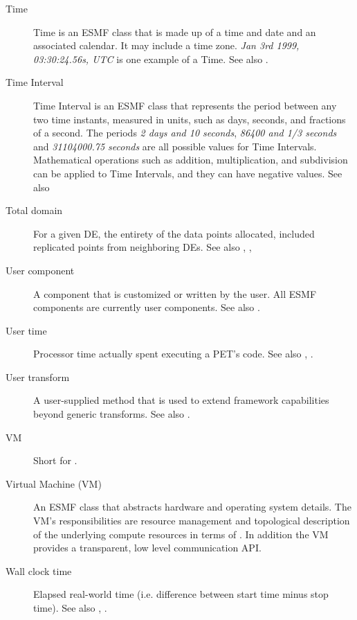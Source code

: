 \begin{description}
\label{glos:TimeInstant}
\item [Time] 
  Time is an ESMF class that is made up of a time and date and an 
  associated calendar. It may include a time zone.
  \emph{Jan 3rd 1999, 03:30:24.56s, UTC} is one example of a Time.
  See also .

\label{glos:TimeInterval} 
\item [Time Interval] 
  Time Interval is an ESMF class that represents the
  period between any two time instants, measured in units, such as days, 
  seconds, and fractions of a second.  The periods \emph{2 days and 10 seconds}, 
  \emph{86400 and 1/3 seconds} and \emph{31104000.75 seconds} are all 
  possible values for Time Intervals.  
  Mathematical operations such as addition, multiplication, and subdivision 
  can be applied to Time Intervals, and they can have negative values. 
  See also 

\label{glos:TotDomain} 
\item[Total domain] 
  For a given DE, the entirety 
  of the data points allocated, included replicated points from neighboring
  DEs.  See also , 
  , 

\label{glos:UserComp} 
\item[User component] 
  A component that is customized or
  written by the user.  All ESMF components are currently user components.
  See also .

\label{glos:UserTime} 
\item[User time] 
  Processor time actually spent executing 
  a PET's code. See also , 
  .

\label{glos:UserTrans} 
\item[User transform] 
  A user-supplied 
  method that is used to extend framework capabilities beyond generic 
  transforms. See also . 

\label{glos:VM} 
\item[VM] 
  Short for .

\label{glos:VMachine} 
\item[Virtual Machine (VM)] 
  An ESMF class that abstracts hardware and 
  operating system details. The VM's responsibilities are resource management
  and topological description of the underlying compute resources in terms of 
  . In addition the VM provides a transparent, low level
  communication API. 

\label{glos:WallClockTime} 
\item [Wall clock time] 
  Elapsed real-world time 
  (i.e. difference between start time minus stop time).
  See also , .

\end{description}
